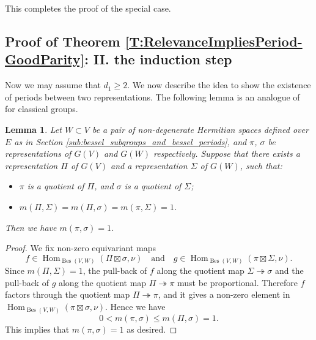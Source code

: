 \documentclass[11pt,letterpaper]{amsart}
\theoremstyle{plain}
\newcounter{theorem}[section]
\numberwithin{theorem}{section}
\numberwithin{equation}{subsection}
\newtheorem{Lem}[theorem]{Lemma}
\theoremstyle{remark}
\newcommand{\Hom}{\operatorname{Hom}}
\newcommand{\Bes}{\operatorname{Bes}} %
\begin{document}
\vskip 5pt

This completes the proof of the special case.

\vskip 5pt


\subsection{Proof of Theorem \ref{T:RelevanceImpliesPeriod-GoodParity}: II. the induction step} %
\label{sub:proof_of_theorem_t:relevanceimpliesperiod-goodparity_ii_the_induction_step}

Now we may assume that $d_1\geq 2$. We now describe the idea to show the existence of periods between two representations. The following lemma is an analogue of \cite[Lem. 10.1]{chan2022SQIrr} for classical groups.

\begin{Lem}\label{L:3multi1Implies1multi1}
Let $W\subset V$ be a pair of non-degenerate Hermitian spaces defined over $E$ as in Section \ref{sub:bessel_subgroups_and_bessel_periods}, and $\pi$, $\sigma$ be representations of $G\left(V\right)$ and $G\left(W\right)$ respectively. Suppose that there exists a representation $\Pi$ of $G\left(V\right)$ and a representation $\Sigma$ of $G\left(W\right)$, such that:
\begin{itemize}
       \item $\pi$ is a quotient of $\Pi$, and $\sigma$ is a quotient of $\Sigma$;

       \vskip 5pt

       \item $m\left(\Pi,\Sigma\right)=m\left(\Pi,\sigma\right)=m\left(\pi,\Sigma\right)=1$.
   \end{itemize} 
Then we have $m\left(\pi,\sigma\right)=1$.  
\end{Lem}

\vskip 5pt

\begin{proof}
We fix non-zero equivariant maps
\[
    f\in\Hom_{\Bes\left(V,W\right)}\left(\Pi\boxtimes\sigma,\nu\right) \quad \text{and} \quad g\in\Hom_{\Bes\left(V,W\right)}\left(\pi\boxtimes\Sigma,\nu\right).
\]
Since $m\left(\Pi,\Sigma\right)=1$, the pull-back of $f$ along the quotient map $\Sigma\twoheadrightarrow\sigma$ and the pull-back of $g$ along the quotient map $\Pi\twoheadrightarrow\pi$ must be proportional. Therefore $f$ factors through the quotient map $\Pi\twoheadrightarrow\pi$, and it gives a non-zero element in $\Hom_{\Bes\left(V,W\right)}\left(\pi\boxtimes\sigma,\nu\right)$. Hence we have
\[
    0< m\left(\pi,\sigma\right) \leq m\left(\Pi,\sigma\right)=1.
\]
This implies that $m\left(\pi,\sigma\right)=1$ as desired.

\end{proof}
\end{document}
